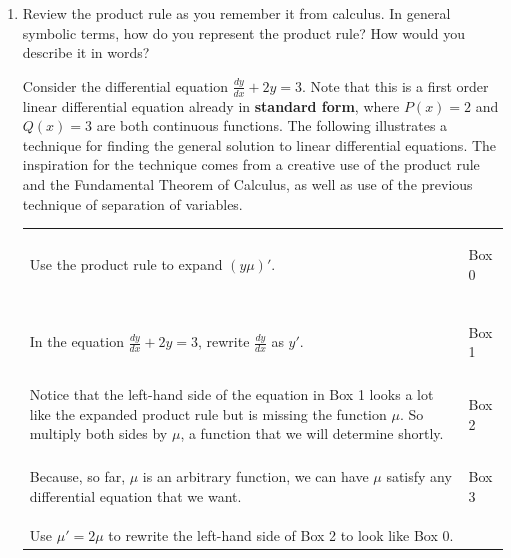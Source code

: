 \begin{enumerate}[resume]
\item Review the product rule as you remember it from calculus. In general symbolic terms, how do you represent the product rule? How would you describe it in words?
\vfill

Consider the differential equation $\displaystyle\frac{dy}{dx}+2y=3$. Note that this is a first order linear differential equation already in \textbf{standard form}, where $P(x)=2$ and $Q(x)=3$ are both continuous functions. The following illustrates a technique for finding the general solution to linear differential equations. The inspiration for the technique comes from a creative use of the product rule and the Fundamental Theorem of Calculus, as well as use of the previous technique of separation of variables.
\begin{center} \renewcommand{\arraystretch}{1.5}
\begin{tabular}{|p{2.5in}|V|}
\hline
Use the product rule to expand $(y \mu)'$. & \begin{flushright}{\footnotesize Box 0}\end{flushright} \\
{} & {} \\ 
\hline
In the equation $\frac{dy}{dx}+2y=3$, rewrite $\frac{dy}{dx}$ as $y'$.& \begin{flushright}{\footnotesize Box 1}\end{flushright} \\
\hline
Notice that the left-hand side of the equation in Box 1 looks a lot like the expanded product rule but is missing the function $\mu$.  So multiply both sides by $\mu$, a function that we will determine shortly.  & \begin{flushright}{\footnotesize Box 2}\end{flushright} \\
\hline
Because, so far, $\mu$ is an arbitrary function, we can have $\mu$ satisfy any differential equation that we want. & \begin{flushright}{\footnotesize Box 3}\end{flushright} \\
Use $\mu' = 2\mu$ to rewrite the left-hand side of Box 2 to look like Box 0. & {} \\
\hline
\end{tabular}\end{center}


\end{enumerate}
